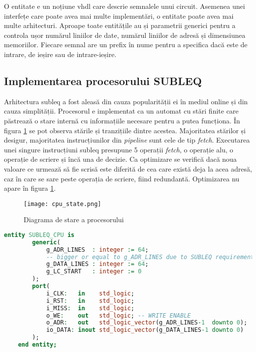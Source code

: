 \documentclass[../main.tex]{subfiles}
\begin{document}
O entitate e un noțiune \acrshort{vhdl}
care descrie semnalele unui circuit. Asemenea unei interfețe care poate avea mai multe implementări, o entitate poate
avea mai multe arhitecturi. Aproape toate entitățile au și parametrii generici pentru a controla ușor numărul liniilor de date,
numărul liniilor de adresă și dimensiunea memoriilor. Fiecare semnal are un prefix în nume pentru a specifica dacă este
de intrare, de ieșire sau de intrare-ieșire.

\subsection{Implementarea procesorului SUBLEQ}
Arhitectura \acrshort{subleq} a fost aleasă din cauza popularității ei în mediul online și din cauza simplității.
Procesorul e implementat ca un automat cu stări finite care păstrează o stare internă cu informațiile necesare
pentru a putea funcționa. În figura \ref{fig:cpu_state} se pot observa stările și tranzițiile dintre acestea.
Majoritatea stărilor și desigur, majoritatea instrucțiunilor din \emph{pipeline} sunt cele de tip \emph{fetch}.
Executarea unei singure instrucțiuni \acrshort{subleq} presupune 5 operații \emph{fetch}, o operație \acrshort{alu},
o operație de scriere și încă una de decizie. Ca optimizare se verifică dacă noua valoare ce urmează să fie scrisă
este diferită de cea care există deja la acea adresă, caz în care se sare peste operația de scriere, fiind
redundantă. Optimizarea nu apare în figura \ref{fig:cpu_state}.

\begin{figure}[h]
    \centering
    \texttt{[image: cpu\_state.png]}
    \caption{Diagrama de stare a procesorului}
    \label{fig:cpu_state}
\end{figure}

\begin{lstlisting}[language=VHDL, caption={Entitatea procesorului}, label={lst:cpu}]
    entity SUBLEQ_CPU is
        generic(
            g_ADR_LINES  : integer := 64;
            -- bigger or equal to g_ADR_LINES due to SUBLEQ requirements
            g_DATA_LINES : integer := 64;
            g_LC_START   : integer := 0
        );
        port(
            i_CLK:   in    std_logic;
            i_RST:   in    std_logic;
            i_MISS:  in    std_logic;
            o_WE:    out   std_logic; -- WRITE ENABLE
            o_ADR:   out   std_logic_vector(g_ADR_LINES-1  downto 0);
            io_DATA: inout std_logic_vector(g_DATA_LINES-1 downto 0) 
        );
    end entity;
\end{lstlisting}
\end{document}
